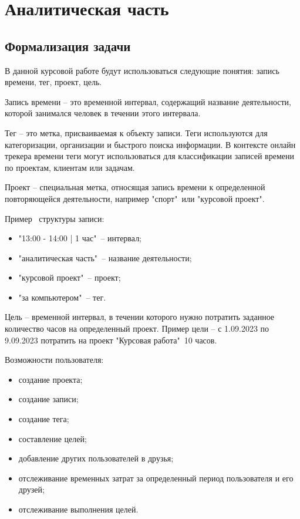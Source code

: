 \section{Аналитическая часть}

\subsection{Формализация задачи}
В данной курсовой работе будут использоваться следующие понятия: запись времени, тег, проект, цель.

Запись времени -- это временной интервал, содержащий название деятельности, которой занимался человек в течении этого интервала.

Тег -- это метка, присваиваемая к объекту записи. Теги используются для категоризации, организации и быстрого поиска информации. В контексте онлайн трекера времени теги могут использоваться для классификации записей времени по проектам, клиентам или задачам.

Проект -- специальная метка, относящая запись времени к определенной повторяющейся деятельности, например "спорт"\ или "курсовой проект".

Пример  структуры записи:
\begin{itemize}[leftmargin=1.6\parindent]
	\item "13:00 - 14:00 | 1 час"\  -- интервал;
	\item "аналитическая часть"\ -- название деятельности;
	\item "курсовой проект"\ -- проект;
	\item "за компьютером"\ -- тег.
\end{itemize}

Цель -- временной интервал, в течении которого нужно потратить заданное количество часов на определенный проект. Пример цели -- с 1.09.2023 по 9.09.2023 потратить на проект "Курсовая работа"\ 10 часов.

\newpage
Возможности пользователя:
\begin{itemize}[leftmargin=1.6\parindent]
	\item создание проекта;
	\item создание записи;
	\item создание тега;
	\item составление целей;
	\item добавление других пользователей в друзья;
	\item отслеживание временных затрат за определенный период пользователя и его друзей;
	\item отслеживание выполнения целей.
\end{itemize}

